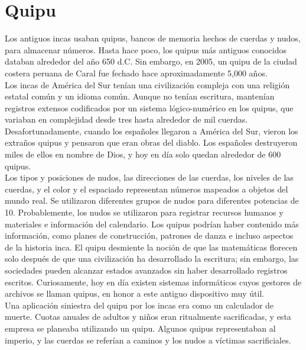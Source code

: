 \section*{Quipu}

\noindent Los antiguos incas usaban quipus, bancos de memoria hechos de cuerdas y nudos, para almacenar números. Hasta hace poco, los quipus más antiguos conocidos databan alrededor del año 650 d.C. Sin embargo, en 2005, un quipu de la ciudad costera peruana de Caral fue fechado hace aproximadamente 5,000 años.\\

\noindent Los incas de América del Sur tenían una civilización compleja con una religión estatal común y un idioma común. Aunque no tenían escritura, mantenían registros extensos codificados por un sistema lógico-numérico en los quipus, que variaban en complejidad desde tres hasta alrededor de mil cuerdas. Desafortunadamente, cuando los españoles llegaron a América del Sur, vieron los extraños quipus y pensaron que eran obras del diablo. Los españoles destruyeron miles de ellos en nombre de Dios, y hoy en día solo quedan alrededor de 600 quipus. \\

\noindent Los tipos y posiciones de nudos, las direcciones de las cuerdas, los niveles de las cuerdas, y el color y el espaciado representan números mapeados a objetos del mundo real. Se utilizaron diferentes grupos de nudos para diferentes potencias de 10. Probablemente, los nudos se utilizaron para registrar recursos humanos y materiales e información del calendario. Los quipus podrían haber contenido más información, como planes de construcción, patrones de danza e incluso aspectos de la historia inca. El quipu desmiente la noción de que las matemáticas florecen solo después de que una civilización ha desarrollado la escritura; sin embargo, las sociedades pueden alcanzar estados avanzados sin haber desarrollado registros escritos. Curiosamente, hoy en día existen sistemas informáticos cuyos gestores de archivos se llaman quipus, en honor a este antiguo dispositivo muy útil. \\

\noindent Una aplicación siniestra del quipu por los incas era como un calculador de muerte. Cuotas anuales de adultos y niños eran ritualmente sacrificadas, y esta empresa se planeaba utilizando un quipu. Algunos quipus representaban al imperio, y las cuerdas se referían a caminos y los nudos a víctimas sacrificiales.
